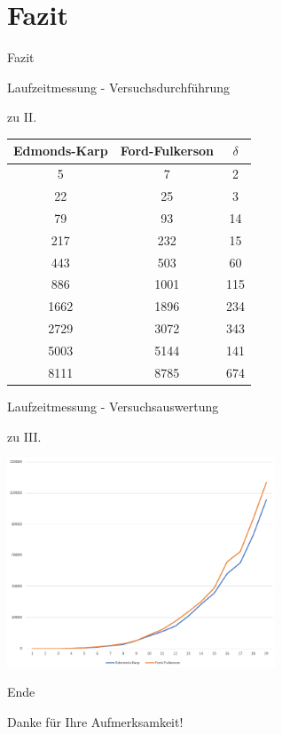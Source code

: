 \documentclass{beamer}
\begin{document}
    \section{Fazit}
    \begin{frame}{Fazit}

    \end{frame}

    \begin{frame}{Laufzeitmessung - Versuchsdurchf\"uhrung}
        \begin{block}{zu II.}
            \begin{center}
                \begin{tabular}{c|c|c}
                    \textbf{Edmonds-Karp} & \textbf{Ford-Fulkerson} & $\delta$\\
                    \hline
                    5 & 7 & 2\\
                    22 & 25 & 3\\
                    79 & 93 & 14\\
                    217 & 232 & 15\\
                    443 & 503 & 60\\
                    886 & 1001 & 115\\
                    1662 & 1896 & 234\\
                    2729 & 3072 & 343\\
                    5003 & 5144 & 141\\
                    8111 & 8785 & 674\\
                \end{tabular}
            \end{center}
        \end{block}
    \end{frame}

    \begin{frame}{Laufzeitmessung - Versuchsauswertung}
        \begin{block}{zu III.}
            \begin{center}
                \includegraphics[width=8cm]{../auswertung.PNG}
            \end{center}
        \end{block}
    \end{frame}

    \begin{frame}{Ende}
        \begin{center}
            Danke f\"ur Ihre Aufmerksamkeit!
        \end{center}
    \end{frame}
\end{document}
